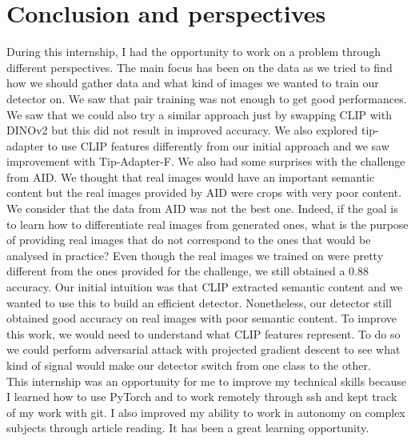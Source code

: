\documentclass[12pt,a4paper]{article}
\begin{document}
\section{Conclusion and perspectives}
During this internship, I had the opportunity to work on a problem through different perspectives. The main focus has been on the data as we tried to find how we should gather data and what kind of images we wanted to train our detector on. We saw that pair training was not enough to get good performances. We saw that we could also try a similar approach just by swapping CLIP with DINOv2 but this did not result in improved accuracy. We also explored tip-adapter to use CLIP features differently from our initial approach and we saw improvement with Tip-Adapter-F. We also had some surprises with the challenge from AID. We thought that real images would have an important semantic content but the real images provided by AID were crops with very poor content. We consider that the data from AID was not the best one. Indeed, if the goal is to learn how to differentiate real images from generated ones, what is the purpose of providing real images that do not correspond to the ones that would be analysed in practice? Even though the real images we trained on were pretty different from the ones provided for the challenge, we still obtained a 0.88 accuracy. Our initial intuition was that CLIP extracted semantic content and we wanted to use this to build an efficient detector. Nonetheless, our detector still obtained good accuracy on real images with poor semantic content.  To improve this work, we would need to understand what CLIP features represent. To do so we could perform adversarial attack with projected gradient descent to see what kind of signal would make our detector switch from one class to the other.\\
This internship was an opportunity for me to improve my technical skills because I learned how to use PyTorch and to work remotely through ssh and kept track of my work with git. I also improved my ability to work in autonomy on complex subjects through article reading. It has been a great learning opportunity.

\newpage
\printbibliography
\end{document}
